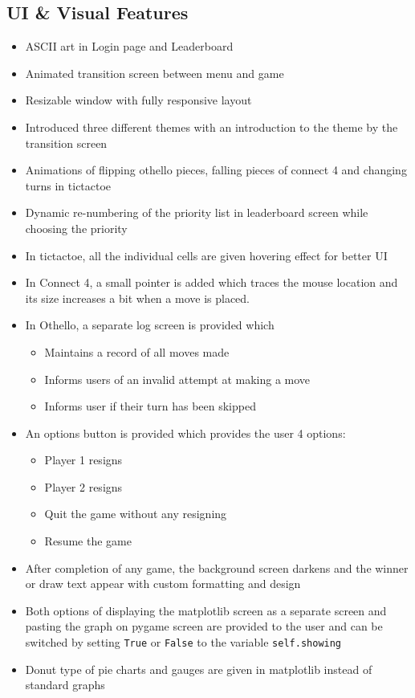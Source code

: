 \documentclass[12pt, a4paper]{article}
\begin{document}
\subsection{UI \& Visual Features}
\begin{itemize}
    \item ASCII art in Login page and Leaderboard
    \item Animated transition screen between menu and game
    \item Resizable window with fully responsive layout
    \item Introduced three different themes with an introduction to the theme by the transition screen
    \item Animations of flipping othello pieces, falling pieces of connect 4 and changing turns in tictactoe
    \item Dynamic re-numbering of the priority list in leaderboard screen while choosing the priority
    \item In tictactoe, all the individual cells are given hovering effect for better UI
    \item In Connect 4, a small pointer is added which traces the mouse location and its size increases a bit when a move is placed.
    \item In Othello, a separate log screen is provided which \begin{itemize}
        \item Maintains a record of all moves made
        \item Informs users of an invalid attempt at making a move
        \item Informs user if their turn has been skipped
    \end{itemize}
    \item An options button is provided which provides the user 4 options: \begin{itemize}
        \item Player 1 resigns
        \item Player 2 resigns
        \item Quit the game without any resigning
        \item Resume the game
    \end{itemize}
    \item After completion of any game, the background screen darkens and the winner or draw text appear with custom formatting and design
    \item Both options of displaying the matplotlib screen as a separate screen and pasting the graph on pygame screen are provided to the user and can be switched by setting \texttt{True} or \texttt{False} to the variable \texttt{self.showing}
    \item{Donut type of pie charts and gauges are given in matplotlib instead of standard graphs}
\end{itemize}
\end{document}

